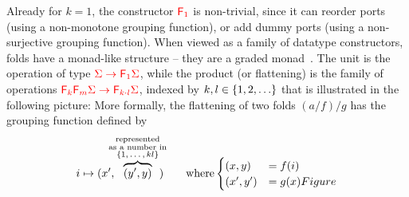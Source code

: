 Already for $k=1$, the constructor $\reduce 1$ is non-trivial, since it can reorder ports (using a non-monotone grouping function), or add dummy ports (using a non-surjective grouping function).
When viewed as a family of datatype constructors,  folds have a monad-like structure -- they are a graded  monad~\cite[p. 518]{fujiShinyaMellies2016}. The unit is the operation 
of type ${\color{red}{\Sigma \to {\color{red}{\mathsf F_{1}}}\Sigma}}$, while  the product (or flattening) is the family of operations ${\color{red}{{\color{red}{\mathsf F_{k}}}{\color{red}{\mathsf F_{m}}}\Sigma \to {\color{red}{\mathsf F_{k \cdot l}}}\Sigma}}$, indexed by $k,l \in \{1,2,\ldots\}$ that is illustrated in the following picture:
More formally, the flattening of two folds $(a/f)/g$ has the grouping function defined by
\begin{align*}
i \mapsto (x', \!\!\!\!\overbrace{(y',y)}^{\substack{\text{represented}\\ \text{as a number in}\\ \text{$\set{1,\ldots,kl}$}}}\!\!\!\!) \qquad \text{where} \begin{cases}
    (x,y) &= f(i)\\
    (x',y') &= g(x)Figure
\end{cases}
\end{align*}



 

